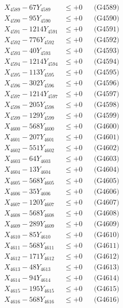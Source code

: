 \documentclass[a4paper,10pt]{article}
\begin{document}
{\begin{align}
X_{4589} - 67Y_{4589} &\leq +0 && \text{(G4589)} \\
X_{4590} - 95Y_{4590} &\leq +0 && \text{(G4590)} \\
\allowbreak
X_{4591} - 1214Y_{4591} &\leq +0 && \text{(G4591)} \\
X_{4592} - 776Y_{4592} &\leq +0 && \text{(G4592)} \\
X_{4593} - 40Y_{4593} &\leq +0 && \text{(G4593)} \\
X_{4594} - 1214Y_{4594} &\leq +0 && \text{(G4594)} \\
X_{4595} - 113Y_{4595} &\leq +0 && \text{(G4595)} \\
X_{4596} - 302Y_{4596} &\leq +0 && \text{(G4596)} \\
X_{4597} - 1214Y_{4597} &\leq +0 && \text{(G4597)} \\
X_{4598} - 205Y_{4598} &\leq +0 && \text{(G4598)} \\
X_{4599} - 129Y_{4599} &\leq +0 && \text{(G4599)} \\
X_{4600} - 568Y_{4600} &\leq +0 && \text{(G4600)} \\
\allowbreak
X_{4601} - 207Y_{4601} &\leq +0 && \text{(G4601)} \\
X_{4602} - 551Y_{4602} &\leq +0 && \text{(G4602)} \\
X_{4603} - 64Y_{4603} &\leq +0 && \text{(G4603)} \\
X_{4604} - 13Y_{4604} &\leq +0 && \text{(G4604)} \\
X_{4605} - 568Y_{4605} &\leq +0 && \text{(G4605)} \\
X_{4606} - 35Y_{4606} &\leq +0 && \text{(G4606)} \\
X_{4607} - 120Y_{4607} &\leq +0 && \text{(G4607)} \\
X_{4608} - 568Y_{4608} &\leq +0 && \text{(G4608)} \\
X_{4609} - 289Y_{4609} &\leq +0 && \text{(G4609)} \\
X_{4610} - 85Y_{4610} &\leq +0 && \text{(G4610)} \\
\allowbreak
X_{4611} - 568Y_{4611} &\leq +0 && \text{(G4611)} \\
X_{4612} - 171Y_{4612} &\leq +0 && \text{(G4612)} \\
X_{4613} - 48Y_{4613} &\leq +0 && \text{(G4613)} \\
X_{4614} - 94Y_{4614} &\leq +0 && \text{(G4614)} \\
X_{4615} - 195Y_{4615} &\leq +0 && \text{(G4615)} \\
X_{4616} - 568Y_{4616} &\leq +0 && \text{(G4616)} \\

\end{align}}
\end{document}
